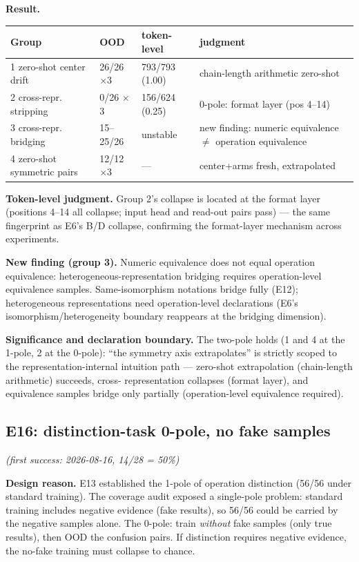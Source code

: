 \documentclass[sigplan,10pt,anonymous,review]{acmart}
\begin{document}
\textbf{Result.}
\begin{center}
\begin{tabular}{llll}
\toprule
Group & OOD & token-level & judgment \\
\midrule
1 zero-shot center drift & 26/26 $\times$3 & 793/793 (1.00) & chain-length arithmetic zero-shot \\
2 cross-repr. stripping & 0/26 $\times$3 & 156/624 (0.25) & 0-pole: format layer (pos 4--14) \\
3 cross-repr. bridging & 15--25/26 & unstable & new finding: numeric equivalence $\neq$ operation equivalence \\
4 zero-shot symmetric pairs & 12/12 $\times$3 & --- & center+arms fresh, extrapolated \\
\bottomrule
\end{tabular}
\end{center}

\textbf{Token-level judgment.} Group 2's collapse is located at the format
layer (positions 4--14 all collapse; input head and read-out pairs pass)
--- the same fingerprint as E6's B/D collapse, confirming the format-layer
mechanism across experiments.

\textbf{New finding (group 3).} Numeric equivalence does not equal
operation equivalence: heterogeneous-representation bridging requires
operation-level equivalence samples. Same-isomorphism notations bridge
fully (E12); heterogeneous representations need operation-level
declarations (E6's isomorphism/heterogeneity boundary reappears at the
bridging dimension).

\textbf{Significance and declaration boundary.} The two-pole holds (1 and
4 at the 1-pole, 2 at the 0-pole): ``the symmetry axis extrapolates'' is
strictly scoped to the representation-internal intuition path ---
zero-shot extrapolation (chain-length arithmetic) succeeds, cross-
representation collapses (format layer), and equivalence samples bridge
only partially (operation-level equivalence required).

\subsection{E16: distinction-task 0-pole, no fake samples}\hfill\textit{(first success: 2026-08-16, 14/28 = 50\%)}

\textbf{Design reason.} E13 established the 1-pole of operation distinction
(56/56 under standard training). The coverage audit exposed a single-pole
problem: standard training includes negative evidence (fake results), so
56/56 could be carried by the negative samples alone. The 0-pole: train
\emph{without} fake samples (only true results), then OOD the confusion
pairs. If distinction requires negative evidence, the no-fake training
must collapse to chance.
\end{document}

